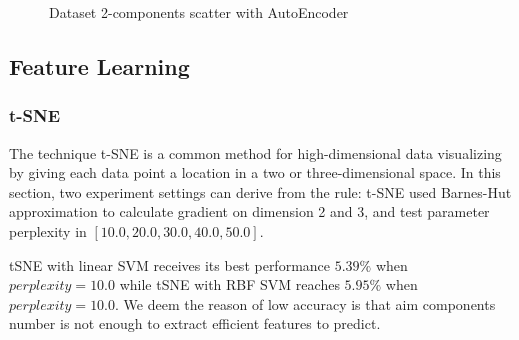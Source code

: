 \documentclass{article}
\begin{document}
\begin{center}
\begin{figure}[htbp]
\centering
{}
\quad
{}
\caption{Dataset 2-components scatter with AutoEncoder}
\label{Fig6}
\end{figure}
\end{center}

\subsection{Feature Learning}
\subsubsection{t-SNE}

The technique t-SNE is a common method for high-dimensional data visualizing by giving each data point a location in a two or three-dimensional space. In this section, two experiment settings can derive from the rule: t-SNE used Barnes-Hut approximation to calculate gradient on dimension 2 and 3, and test parameter perplexity in $[10.0, 20.0, 30.0, 40.0, 50.0]$. 

tSNE with linear SVM receives its best performance $5.39\%$ when $perplexity=10.0$ while tSNE with RBF SVM reaches $5.95\%$ when $perplexity=10.0$. We deem the reason of low accuracy is that aim components number is not enough to extract efficient features to predict.
\end{document}
